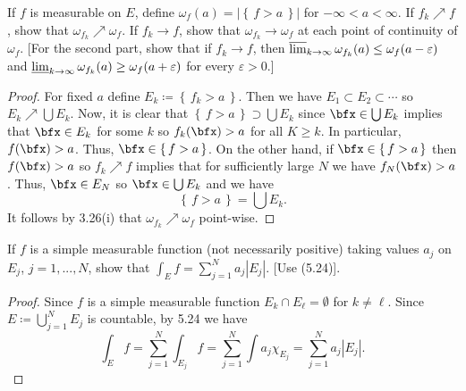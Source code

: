 \begin{problem}
If $f$ is measurable on $E$, define
$\omega_f(a)=\left|\left\{\,f>a\,\right\}\right|$ for
$-\infty<a<\infty$. If $f_k\nearrow f$, show that
$\omega_{f_k}\nearrow\omega_f$. If $f_k\to f$, show that
$\omega_{f_k}\to\omega_f$ at each point of continuity of $\omega_f$. [For
the second part, show that if $f_k\to f$, then
$\varlimsup_{k\to\infty}\omega_{f_k}(a)\leq\omega_f(a-\varepsilon)$ and
$\varliminf_{k\to\infty}\omega_{f_k}(a)\geq\omega_f(a+\varepsilon)$ for every
$\varepsilon>0$.]
\end{problem}
\begin{proof}
For fixed $a$ define $E_k\coloneqq\left\{\,f_k>a\,\right\}$. Then we have
$E_1\subset E_2\subset\cdots$ so $E_k\nearrow\bigcup E_k$. Now, it is clear
that $\left\{\,f>a\,\right\}\supset\bigcup E_k$ since $\bfx\in\bigcup E_k$
implies that $\bfx\in E_k$ for some $k$ so $f_k(\bfx)>a$ for all $K\geq
k$. In particular, $f(\bfx)>a$. Thus, $\bfx\in\left\{\,f>a\,\right\}$. On the
other hand, if $\bfx\in\left\{\,f>a\,\right\}$ then $f(\bfx)>a$ so
$f_k\nearrow f$ implies that for sufficiently large $N$ we have
$f_N(\bfx)>a$. Thus, $\bfx\in E_N$ so $\bfx\in\bigcup E_k$ and we have
\begin{equation}
\label{eq:equality-of-f-a}
\left\{\,f>a\,\right\}=\bigcup E_k.
\end{equation}
It follows by 3.26(i) that $\omega_{f_k}\nearrow\omega_f$ point-wise.
\end{proof}
\newpage

\begin{problem}
If $f$ is a simple measurable function (not necessarily positive) taking
values $a_j$ on $E_j$, $j=1,...,N$, show that $\int_E f=\sum_{j=1}^N
a_j\left|E_j\right|$. [Use (5.24)].
\end{problem}
\begin{proof}
Since $f$ is a simple measurable function $E_k\cap E_\ell=\emptyset$ for
$k\neq\ell$. Since $E\coloneqq\bigcup_{j=1}^N E_j$ is countable, by 5.24 we
have
\[
\int_E f=\sum_{j=1}^N\int_{E_j} f=\sum_{j=1}^N\int a_j\chi_{E_j}=\sum_{j=1}^N a_j|E_j|.
\]
\end{proof}
\newpage

